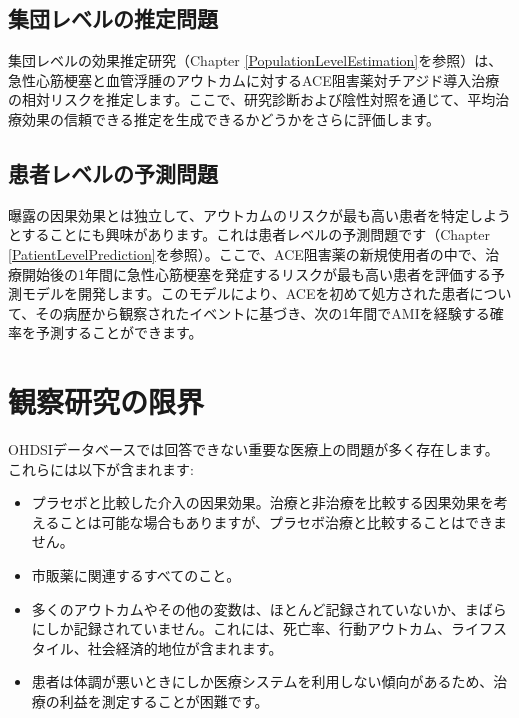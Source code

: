 \documentclass[
  11pt]{book}
\providecommand{\tightlist}{%
  \setlength{\itemsep}{0pt}\setlength{\parskip}{0pt}}
\theoremstyle{definition}
\theoremstyle{definition}
\theoremstyle{definition}
\theoremstyle{definition}
\theoremstyle{remark}
\begin{document}
\subsection{集団レベルの推定問題}\label{ux96c6ux56e3ux30ecux30d9ux30ebux306eux63a8ux5b9aux554fux984c}

集団レベルの効果推定研究（Chapter \ref{PopulationLevelEstimation}を参照）は、急性心筋梗塞と血管浮腫のアウトカムに対するACE阻害薬対チアジド導入治療の相対リスクを推定します。ここで、研究診断および陰性対照を通じて、平均治療効果の信頼できる推定を生成できるかどうかをさらに評価します。

\subsection{患者レベルの予測問題}\label{ux60a3ux8005ux30ecux30d9ux30ebux306eux4e88ux6e2cux554fux984c}

曝露の因果効果とは独立して、アウトカムのリスクが最も高い患者を特定しようとすることにも興味があります。これは患者レベルの予測問題です（Chapter \ref{PatientLevelPrediction}を参照）。ここで、ACE阻害薬の新規使用者の中で、治療開始後の1年間に急性心筋梗塞を発症するリスクが最も高い患者を評価する予測モデルを開発します。このモデルにより、ACEを初めて処方された患者について、その病歴から観察されたイベントに基づき、次の1年間でAMIを経験する確率を予測することができます。

\section{観察研究の限界}\label{ux89b3ux5bdfux7814ux7a76ux306eux9650ux754c}


OHDSIデータベースでは回答できない重要な医療上の問題が多く存在します。これらには以下が含まれます:

\begin{itemize}
\tightlist
\item
  プラセボと比較した介入の因果効果。治療と非治療を比較する因果効果を考えることは可能な場合もありますが、プラセボ治療と比較することはできません。
\item
  市販薬に関連するすべてのこと。
\item
  多くのアウトカムやその他の変数は、ほとんど記録されていないか、まばらにしか記録されていません。これには、死亡率、行動アウトカム、ライフスタイル、社会経済的地位が含まれます。
\item
  患者は体調が悪いときにしか医療システムを利用しない傾向があるため、治療の利益を測定することが困難です。
\end{itemize}
\end{document}
